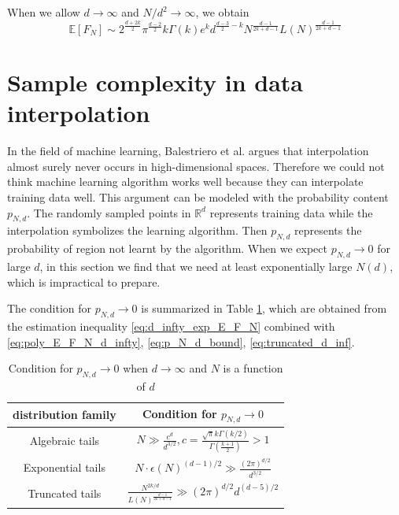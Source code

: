\documentclass{aptpub}
\def\E{\mathbb{E}}
\def\R{\mathbb{R}}
\begin{document}
 When we allow $d\to \infty$ and $N/d^2 \to \infty$, we obtain
 \begin{equation}\label{eq:truncated_d_inf}
  \E[F_N] \sim 2^{\frac{d+2k}{2}}\pi^{\frac{d-2}{2}} k\Gamma(k)e^k d^{\frac{d-3}{2}-k}
  N^{\frac{d-1}{2k+d-1}} L(N)^{\frac{d-1}{2k+d-1}}
 \end{equation}
\section{Sample complexity in data interpolation}\label{sec:sample_complexity}
In the field of machine learning,
Balestriero et al. \cite{balestriero2021learning}
argues that interpolation almost surely never occurs in high-dimensional spaces.
Therefore we could not think machine learning algorithm works well because they can interpolate training data
well.
This argument can be modeled with the probability content $p_{N,d}$.
The randomly sampled points in $\R^d$ represents training data
while the interpolation
symbolizes the learning algorithm. Then $p_{N,d}$ represents
the probability of region not learnt by the algorithm.
When we expect $p_{N,d} \to 0$ for large $d$,
in this section
we find that we need
at least exponentially large $N(d)$, which is impractical to prepare.

The condition for $p_{N,d} \to 0$ is summarized in Table \ref{tab:cond},
which are obtained
from the estimation inequality \eqref{eq:d_infty_exp_E_F_N}
combined with \eqref{eq:poly_E_F_N_d_infty},
\eqref{eq:p_N_d_bound},
\eqref{eq:truncated_d_inf}.


\begin{table}[!ht]
     \centering
     \begin{tabular}{cc}
         \hline
         distribution family &  Condition for $p_{N,d} \to 0$ \\
         \hline
        Algebraic tails & $N \gg \frac{c^d}{d^{3/2}}, c=\frac{\sqrt{\pi}k\Gamma(k/2)}{\Gamma(\frac{k+1}{2})}>1$ \\
        \hline
        Exponential tails 
        & $ N\cdot \epsilon(N)^{(d-1)/2} \gg \frac{(2\pi)^{d/2}}{d^{3/2}}$ \\
        \hline
        Truncated tails 
        & $\frac{N^{2k/d}}{L(N)^{\frac{d-1}{2k+d-1}}}
        \gg (2\pi)^{d/2}d^{(d-5)/2}$\\
        \hline
     \end{tabular}
     \caption{Condition for $p_{N,d}\to 0$ when $d\to \infty$ and $N$ is a function of $d$}
     \label{tab:cond}
 \end{table}
\end{document}
